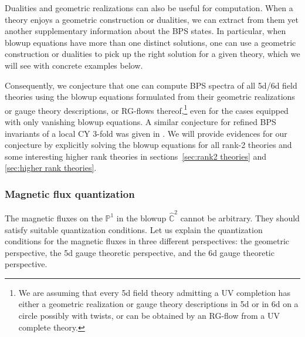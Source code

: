 Dualities and geometric realizations can also be useful for computation. When a theory enjoys a geometric construction or dualities, we can extract from them yet another supplementary information about the BPS states. In particular, when blowup equations have more than one distinct solutions, one can use a geometric construction or dualities to pick up the right solution for a given theory, which we will see with concrete examples below. 

Consequently, we conjecture that one can compute BPS spectra of all 5d/6d field theories using the blowup equations formulated from their geometric realizations or gauge theory descriptions, or RG-flows thereof,\footnote{We are assuming that every 5d field theory admitting a UV completion has either a geometric realization or gauge theory descriptions in 5d or in 6d on a circle possibly with twists, or can be obtained by an RG-flow from a UV complete theory.} even for the cases equipped with only vanishing blowup equations. A similar conjecture for refined BPS invariants of a local CY 3-fold was given in \cite{Huang:2017mis}. We will provide evidences for our conjecture by explicitly solving the blowup equations for all rank-2 theories and some interesting higher rank theories in sections~\ref{sec:rank2 theories} and \ref{sec:higher rank theories}.


\subsubsection{Magnetic flux quantization}\label{sec:magnetic flux quantization}

The magnetic fluxes on the $\mathbb{P}^1$ in the blowup $\hat{\mathbb{C}}^2$ cannot be arbitrary. They should satisfy suitable quantization conditions. Let us explain the quantization conditions for the magnetic fluxes in three different perspectives: the geometric perspective, the 5d gauge theoretic perspective, and the 6d gauge theoretic perspective.

